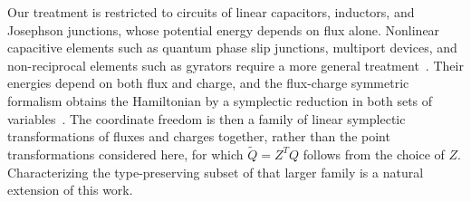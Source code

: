 Our treatment is restricted to circuits of linear capacitors, inductors, and Josephson junctions, whose potential energy depends on flux alone.
Nonlinear capacitive elements such as quantum phase slip junctions, multiport devices, and non-reciprocal elements such as gyrators require a more general treatment~\cite{osborne_symplectic_2023,OsborneFluxChargeSymmetricTheory2024,salcedoGyratorsSuperconductingCircuit2026,parra-rodriguez2023,smitham2024reciprocallumpedelementsuperconductingcircuits}.
Their energies depend on both flux and charge, and the flux-charge symmetric formalism obtains the Hamiltonian by a symplectic reduction in both sets of variables~\cite{OsborneFluxChargeSymmetricTheory2024,salcedoGyratorsSuperconductingCircuit2026}.
The coordinate freedom is then a family of linear symplectic transformations of fluxes and charges together, rather than the point transformations considered here, for which $\tilde Q=Z^TQ$ follows from the choice of $Z$.
Characterizing the type-preserving subset of that larger family is a natural extension of this work.

